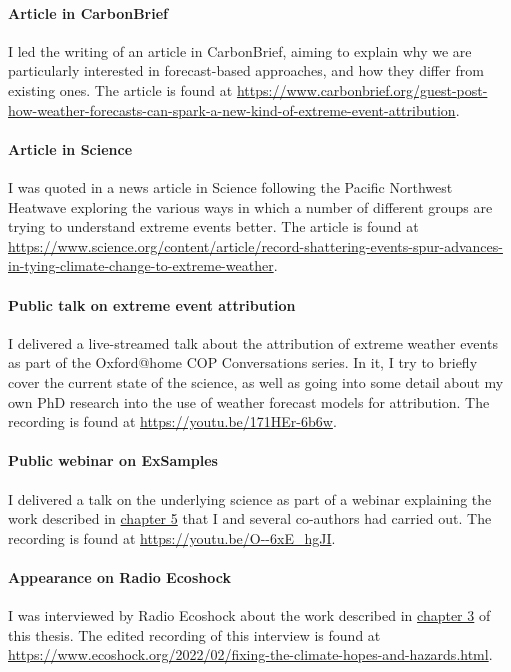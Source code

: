     \paragraph*{Article in CarbonBrief}
    
      I led the writing of an article in CarbonBrief, aiming to explain why we are particularly interested in forecast-based approaches, and how they differ from existing ones. The article is found at \url{https://www.carbonbrief.org/guest-post-how-weather-forecasts-can-spark-a-new-kind-of-extreme-event-attribution}.

    \paragraph*{Article in Science}
    
      I was quoted in a news article in Science following the Pacific Northwest Heatwave exploring the various ways in which a number of different groups are trying to understand extreme events better. The article is found at \url{https://www.science.org/content/article/record-shattering-events-spur-advances-in-tying-climate-change-to-extreme-weather}.

    \paragraph*{Public talk on extreme event attribution}
    
      I delivered a live-streamed talk about the attribution of extreme weather events as part of the Oxford@home COP Conversations series. In it, I try to briefly cover the current state of the science, as well as going into some detail about my own PhD research into the use of weather forecast models for attribution. The recording is found at \url{https://youtu.be/171HEr-6b6w}.

    \paragraph*{Public webinar on ExSamples}
    
      I delivered a talk on the underlying science as part of a webinar explaining the work described in \hyperref[ch5]{chapter 5} that I and several co-authors had carried out. The recording is found at \url{https://youtu.be/O--6xE_hgJI}.

    \paragraph*{Appearance on Radio Ecoshock}
    
      I was interviewed by Radio Ecoshock about the work described in \hyperref[ch3]{chapter 3} of this thesis. The edited recording of this interview is found at \url{https://www.ecoshock.org/2022/02/fixing-the-climate-hopes-and-hazards.html}.